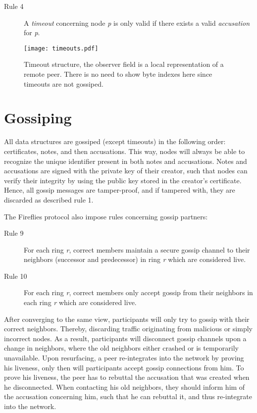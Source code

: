 \documentclass[USenglish]{uit-thesis}
\begin{document}
\begin{description}
\item[Rule 4] A \textit{timeout} concerning node \textit{p} is only valid if there exists a valid \textit{accusation} for \textit{p}.
\end{description} 

\begin{figure}[h]
	\centering
	\texttt{[image: timeouts.pdf]}
	\caption{Timeout structure, the observer field is a local representation of a remote peer. There is no need to show byte indexes here since timeouts are not gossiped.}
	\label{timeout}
\end{figure}

\section{Gossiping}
All data structures are gossiped (except timeouts) in the following order: certificates, notes, and then accusations.
This way, nodes will always be able to recognize the unique identifier present in both notes and accusations.
Notes and accusations are signed with the private key of their creator, such that nodes can verify their integrity by using the public key stored in the creator's certificate. 
Hence, all gossip messages are tamper-proof, and if tampered with, they are discarded as described rule 1.

The Fireflies protocol also impose rules concerning gossip partners:
\begin{description}
	\item[Rule 9] For each ring \textit{r}, correct members maintain a secure gossip channel to their neighbors (successor and predecessor) in ring \textit{r} which are considered live.
	\item[Rule 10] For each ring \textit{r}, correct members only accept gossip from their neighbors in each ring \textit{r} which are considered live.
\end{description} 
After converging to the same view, participants will only try to gossip with their correct neighbors.
Thereby, discarding traffic originating from malicious or simply incorrect nodes.
As a result, participants will disconnect gossip channels upon a change in neighbors, where the old neighbors either crashed or is temporarily unavailable.
Upon resurfacing, a peer re-integrates into the network by proving his liveness, only then will participants accept gossip connections from him.
To prove his liveness, the peer has to rebuttal the accusation that was created when he disconnected.
When contacting his old neighbors, they should inform him of the accusation concerning him, such that he can rebuttal it, and thus re-integrate into the network.
\end{document}
